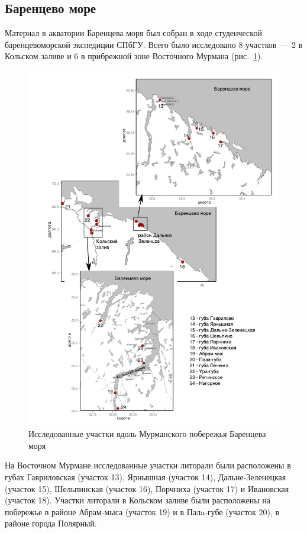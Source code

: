 		\subsection{Баренцево море}
Материал  в акватории Баренцева моря  был  собран    в ходе   студенческой баренцевоморской экспедиции СПбГУ. 
Всего было исследовано $8$ участков~--- $2$ в Кольском заливе и   $6$  в   прибрежной   зоне  Восточного  Мурмана (рис.~\ref{ris:karta_Barents}).  
	\begin{figure}[p]
    \includegraphics[width=\textwidth]{../maps/Barents_sea1.pdf}
    \caption{Исследованные участки вдоль Мурманского побережья Баренцева моря}
    \label{ris:karta_Barents}
	\end{figure}
На   Восточном   Мурмане исследованные участки литорали  были   расположены   в   губах   Гавриловская (участок 13),  Ярнышная (участок 14), Дальне-Зеленецкая (участок 15), Шельпинская (участок 16), Порчниха (участок 17) и Ивановская (участок 18).
Участки литорали  в   Кольском   заливе   были  расположены на побережье в районе Абрам-мыса (участок 19) и в Палa-губе (участок 20), в районе города Полярный. 


